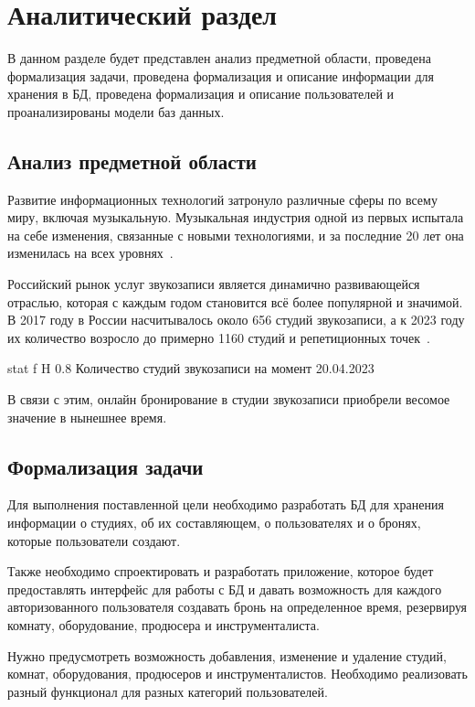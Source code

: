 
\chapter{Аналитический раздел}
В данном разделе будет представлен анализ предметной области, проведена формализация задачи, проведена формализация и описание информации для хранения в БД, проведена формализация и описание пользователей и проанализированы модели баз данных. 
\section{Анализ предметной области}
Развитие информационных технологий затронуло различные сферы по всему миру, включая музыкальную.
Музыкальная индустрия одной из первых испытала на себе изменения, связанные с новыми технологиями, и за последние 20 лет она изменилась на всех уровнях~\cite{music_and_it}.

Российский рынок услуг звукозаписи является динамично развивающейся отраслью, которая с каждым годом становится всё более популярной и значимой.
В 2017 году в России насчитывалось около 656 студий звукозаписи, а к 2023 году их количество возросло до примерно 1160 студий и репетиционных точек~\cite{music_stat}.

{stat} %
{f} %
{H} %
{0.8\textwidth} %
{Количество студий звукозаписи на момент 20.04.2023 \cite{music_stat}} %



В связи с этим, онлайн бронирование в студии звукозаписи приобрели весомое значение в нынешнее время.

\section{Формализация задачи}
Для выполнения поставленной цели необходимо разработать БД для хранения информации о студиях, об их составляющем, о пользователях и о бронях, которые пользователи создают.

Также необходимо спроектировать и разработать приложение, которое будет предоставлять интерфейс для работы с БД и давать возможность для каждого авторизованного пользователя создавать бронь на определенное время, резервируя комнату, оборудование, продюсера и инструменталиста.

Нужно предусмотреть возможность добавления, изменение и удаление студий, комнат, оборудования, продюсеров и инструменталистов.
Необходимо реализовать разный функционал для разных категорий пользователей.

